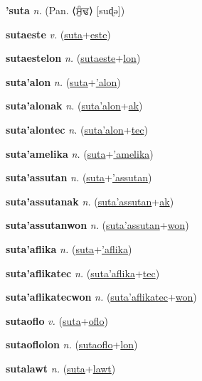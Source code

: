 \textbf{\hypertarget{'suta}{'suta}} \textit{n.} (Pan. ⟨{\gurmukhi{}ਸੁੰਢ}⟩ [suɖə])


\textbf{\hypertarget{sutaeste}{sutaeste}} \textit{v.} (\hyperlink{suta}{suta}+\allowbreak \hyperlink{este}{este})


\textbf{\hypertarget{sutaestelon}{sutaestelon}} \textit{n.} (\hyperlink{sutaeste}{sutaeste}+\allowbreak \hyperlink{lon}{lon})


\textbf{\hypertarget{suta'alon}{suta'alon}} \textit{n.} (\hyperlink{suta}{suta}+\allowbreak \hyperlink{'alon}{'alon})


\textbf{\hypertarget{suta'alonak}{suta'alonak}} \textit{n.} (\hyperlink{suta'alon}{suta'alon}+\allowbreak \hyperlink{ak}{ak})


\textbf{\hypertarget{suta'alontec}{suta'alontec}} \textit{n.} (\hyperlink{suta'alon}{suta'alon}+\allowbreak \hyperlink{tec}{tec})


\textbf{\hypertarget{suta'amelika}{suta'amelika}} \textit{n.} (\hyperlink{suta}{suta}+\allowbreak \hyperlink{'amelika}{'amelika})


\textbf{\hypertarget{suta'assutan}{suta'assutan}} \textit{n.} (\hyperlink{suta}{suta}+\allowbreak \hyperlink{'assutan}{'assutan})


\textbf{\hypertarget{suta'assutanak}{suta'assutanak}} \textit{n.} (\hyperlink{suta'assutan}{suta'assutan}+\allowbreak \hyperlink{ak}{ak})


\textbf{\hypertarget{suta'assutanwon}{suta'assutanwon}} \textit{n.} (\hyperlink{suta'assutan}{suta'assutan}+\allowbreak \hyperlink{won}{won})


\textbf{\hypertarget{suta'aflika}{suta'aflika}} \textit{n.} (\hyperlink{suta}{suta}+\allowbreak \hyperlink{'aflika}{'aflika})


\textbf{\hypertarget{suta'aflikatec}{suta'aflikatec}} \textit{n.} (\hyperlink{suta'aflika}{suta'aflika}+\allowbreak \hyperlink{tec}{tec})


\textbf{\hypertarget{suta'aflikatecwon}{suta'aflikatecwon}} \textit{n.} (\hyperlink{suta'aflikatec}{suta'aflikatec}+\allowbreak \hyperlink{won}{won})


\textbf{\hypertarget{sutaoflo}{sutaoflo}} \textit{v.} (\hyperlink{suta}{suta}+\allowbreak \hyperlink{oflo}{oflo})


\textbf{\hypertarget{sutaoflolon}{sutaoflolon}} \textit{n.} (\hyperlink{sutaoflo}{sutaoflo}+\allowbreak \hyperlink{lon}{lon})


\textbf{\hypertarget{sutalawt}{sutalawt}} \textit{n.} (\hyperlink{suta}{suta}+\allowbreak \hyperlink{lawt}{lawt})


